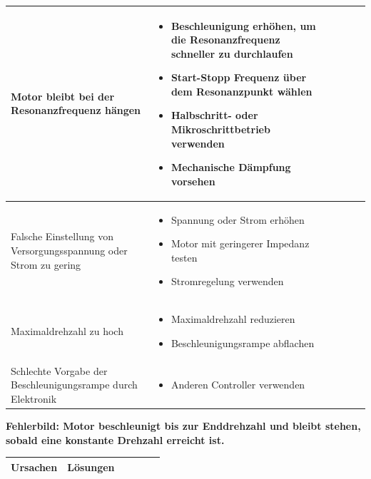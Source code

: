 {{{{{{\begin{center}
\begin{tabularx}{\textwidth}{|X|X|X|X|X|X|}
					Motor bleibt bei der Resonanzfrequenz hängen & 
					\begin{itemize} 
						\item {Beschleunigung erhöhen, um die Resonanzfrequenz schneller zu durchlaufen} 
						\item {Start-Stopp Frequenz über dem Resonanzpunkt wählen} 
						\item {Halbschritt- oder Mikroschrittbetrieb verwenden} 
						\item {Mechanische Dämpfung vorsehen} 
					\end{itemize}	 \\	\hline
					Falsche Einstellung von Versorgungsspannung oder Strom zu gering & 
					\begin{itemize}
						\item {Spannung oder Strom erhöhen} 
						\item {Motor mit geringerer Impedanz testen} 
						\item {Stromregelung verwenden}
					\end{itemize}\\	\hline
					Maximaldrehzahl zu hoch & 
					\begin{itemize}
						\item {Maximaldrehzahl reduzieren} 
						\item {Beschleunigungsrampe abflachen}
					\end{itemize}\\ \hline
					Schlechte Vorgabe der Beschleunigungsrampe durch Elektronik & 
					\begin{itemize}
						\item {Anderen Controller verwenden }
					\end{itemize}\\ \hline
				\end{tabularx}
			\end{center}
			
			{\textbf{Fehlerbild: Motor beschleunigt bis zur Enddrehzahl und bleibt stehen, sobald eine konstante Drehzahl erreicht ist.}
				\begin{center}
					\fontsize{8}{10}\selectfont
					\begin{tabularx}{\textwidth}{|X|X|X|X|X|X|}
						\hline 
						\textbf{Ursachen} & \textbf{Lösungen} \\ \hline
						

\end{tabularx}
\end{center}}}}}}}}
